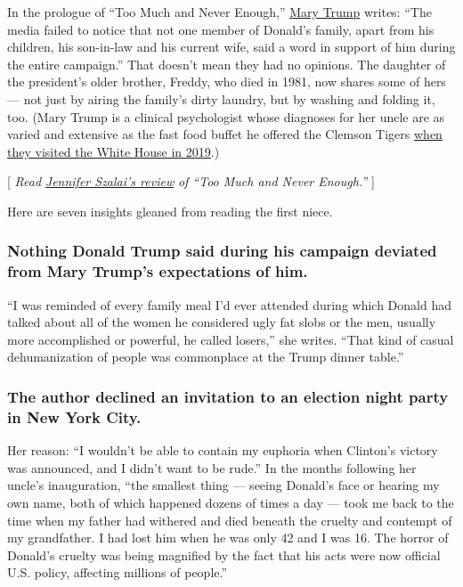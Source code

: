 In the prologue of ``Too Much and Never Enough,''
\href{https://www.nytimes.com/2020/07/13/us/politics/mary-trump-book.html}{Mary
Trump} writes: ``The media failed to notice that not one member of
Donald's family, apart from his children, his son-in-law and his current
wife, said a word in support of him during the entire campaign.'' That
doesn't mean they had no opinions. The daughter of the president's older
brother, Freddy, who died in 1981, now shares some of hers --- not just
by airing the family's dirty laundry, but by washing and folding it,
too. (Mary Trump is a clinical psychologist whose diagnoses for her
uncle are as varied and extensive as the fast food buffet he offered the
Clemson Tigers
\href{https://www.nytimes.com/2019/01/15/us/politics/trump-burgers-fast-food.html}{when
they visited the White House in 2019}.)

{[} \emph{Read}
\href{https://www.nytimes.com/2020/07/08/books/review-too-much-never-enough-mary-trump.html}{\emph{Jennifer
Szalai's review}} \emph{of ``Too Much and Never Enough.''} {]}

Here are seven insights gleaned from reading the first niece.

\hypertarget{nothing-donald-trump-said-during-his-campaign-deviated-from-mary-trumps-expectations-of-him}{%
\subsubsection{Nothing Donald Trump said during his campaign deviated
from Mary Trump's expectations of
him.}\label{nothing-donald-trump-said-during-his-campaign-deviated-from-mary-trumps-expectations-of-him}}

``I was reminded of every family meal I'd ever attended during which
Donald had talked about all of the women he considered ugly fat slobs or
the men, usually more accomplished or powerful, he called losers,'' she
writes. ``That kind of casual dehumanization of people was commonplace
at the Trump dinner table.''

\hypertarget{the-author-declined-an-invitation-to-an-election-night-party-in-new-york-city}{%
\subsubsection{The author declined an invitation to an election night
party in New York
City.}\label{the-author-declined-an-invitation-to-an-election-night-party-in-new-york-city}}

Her reason: ``I wouldn't be able to contain my euphoria when Clinton's
victory was announced, and I didn't want to be rude.'' In the months
following her uncle's inauguration, ``the smallest thing --- seeing
Donald's face or hearing my own name, both of which happened dozens of
times a day --- took me back to the time when my father had withered and
died beneath the cruelty and contempt of my grandfather. I had lost him
when he was only 42 and I was 16. The horror of Donald's cruelty was
being magnified by the fact that his acts were now official U.S. policy,
affecting millions of people.''


